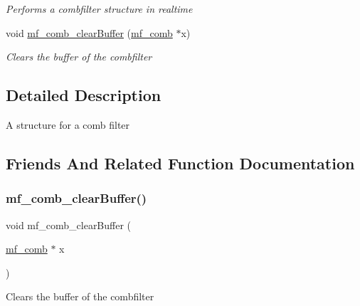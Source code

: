 \begin{DoxyCompactItemize}
\begin{DoxyCompactList}\small\item\em Performs a combfilter structure in realtime ~\newline
 \end{DoxyCompactList}\item 
void \mbox{\hyperlink{structmf__comb_af2c290e8f42f9134fcf25acd4cd0014e}{mf\+\_\+comb\+\_\+clear\+Buffer}} (\mbox{\hyperlink{structmf__comb}{mf\+\_\+comb}} $\ast$x)
\begin{DoxyCompactList}\small\item\em Clears the buffer of the combfilter~\newline
 \end{DoxyCompactList}\end{DoxyCompactItemize}


\subsection{Detailed Description}
A structure for a comb filter ~\newline
 

\subsection{Friends And Related Function Documentation}
\mbox{\label{structmf__comb_af2c290e8f42f9134fcf25acd4cd0014e}} 
\subsubsection{\texorpdfstring{mf\+\_\+comb\+\_\+clear\+Buffer()}{mf\_comb\_clearBuffer()}}
{\footnotesize\ttfamily void mf\+\_\+comb\+\_\+clear\+Buffer (\begin{DoxyParamCaption}\item[{\mbox{\hyperlink{structmf__comb}{mf\+\_\+comb}} $\ast$}]{x }\end{DoxyParamCaption})\hspace{0.3cm}{\ttfamily [related]}}



Clears the buffer of the combfilter~\newline
 


